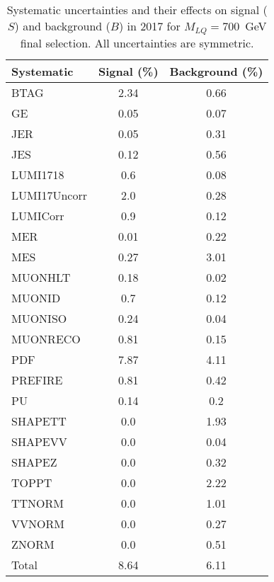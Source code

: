 \begin{table}[htbp]
\begin{center}
\caption{Systematic uncertainties and their effects on signal ($S$) and background ($B$) in 2017 for $M_{LQ}=700$~GeV final selection. All uncertainties are symmetric.}
\begin{tabular}{lcc}
\hline\hline
Systematic & Signal (\%) & Background (\%) \\ \hline 
BTAG & 2.34 & 0.66\\ 
GE & 0.05 & 0.07\\ 
JER & 0.05 & 0.31\\ 
JES & 0.12 & 0.56\\ 
LUMI1718 & 0.6 & 0.08\\ 
LUMI17Uncorr & 2.0 & 0.28\\ 
LUMICorr & 0.9 & 0.12\\ 
MER & 0.01 & 0.22\\ 
MES & 0.27 & 3.01\\ 
MUONHLT & 0.18 & 0.02\\ 
MUONID & 0.7 & 0.12\\ 
MUONISO & 0.24 & 0.04\\ 
MUONRECO & 0.81 & 0.15\\ 
PDF & 7.87 & 4.11\\ 
PREFIRE & 0.81 & 0.42\\ 
PU & 0.14 & 0.2\\ 
SHAPETT & 0.0 & 1.93\\ 
SHAPEVV & 0.0 & 0.04\\ 
SHAPEZ & 0.0 & 0.32\\ 
TOPPT & 0.0 & 2.22\\ 
TTNORM & 0.0 & 1.01\\ 
VVNORM & 0.0 & 0.27\\ 
ZNORM & 0.0 & 0.51\\ 
Total & 8.64 & 6.11\\ \hline \hline
\end{tabular}
\label{tab:SysUncertainties_uujj_700}
\end{center}
\end{table}

